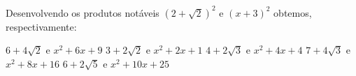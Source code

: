 Desenvolvendo os produtos notáveis $(2+\sqrt{2})^2$ e $(x+3)^2$ obtemos, respectivamente:

$6+4\sqrt{2}$ e $x^2+6x+9$
$3+2\sqrt{2}$ e $x^2+2x+1$
$4+2\sqrt{3}$ e $x^2+4x+4$
$7+4\sqrt{3}$ e $x^2+8x+16$
$6+2\sqrt{5}$ e $x^2+10x+25$


